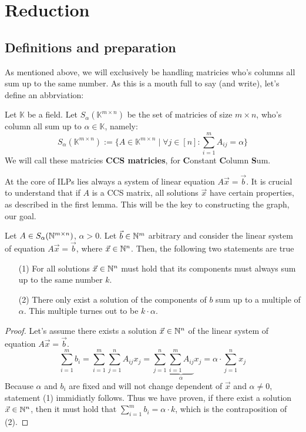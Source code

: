 \section{Reduction}
\subsection{Definitions and preparation}
As mentioned above, we will exclusively be handling matricies who's columns all sum up to the same number. As this is a mouth full to say (and write), let's define an abbrviation:

\begin{definition}
    Let $\mathbb{K}$ be a field. Let $S_{\alpha}(\mathbb{K}^{m \times n})$ be the set of matricies of size $m \times n$, who's column all sum up to $\alpha \in \mathbb{K}$, namely:
    $$S_{\alpha}(\mathbb{K}^{m \times n}) := \{A \in \mathbb{K}^{m \times n}\mid \forall j \in [n]\colon \sum_{i=1}^{m} A_{ij} = \alpha\}$$
    We will call these matricies \textbf{CCS matricies}, for \textbf{C}onstant \textbf{C}olumn \textbf{S}um.
\end{definition}

At the core of ILPs lies always a system of linear equation $A \vec x = \vec b$. It is crucial to understand that if $A$ is a CCS matrix, all solutions $\vec x$ have certain properties, as described in the first lemma. This will be the key to constructing the graph, our goal. 

\begin{lemma}
    \label{lemma:ilp_pre1}
    Let $A\in S_\alpha(\mathbb{N}^{m \times n})$, $\alpha > 0$. Let $\vec b \in \mathbb{N}^m$ arbitrary and consider the linear system of equation $A\vec x=\vec b$, where $\vec x \in \mathbb{N}^n$. Then, the following two statements are true

    \begin{enumerate}
        \item[(1)] For all solutions $\vec x \in \mathbb{N}^n$ must hold that its components must always sum up to the same number $k$.
        \item[(2)] There only exist a solution of the components of $b$ sum up to a multiple of $\alpha$. This multiple turnes out to be $k \cdot \alpha$.
    \end{enumerate}
\end{lemma}

\begin{proof}
    Let's assume there exists a solution $\vec x \in \mathbb{N}^n$ of the linear system of equation $A\vec x=\vec b$.
    $$\sum_{i=1}^m b_i = \sum_{i=1}^{m}\sum_{j=1}^{n}A_{ij} x_j = \sum_{j=1}^{n}\underbrace{\sum_{i=1}^{m}A_{ij}}_\alpha x_j = \alpha \cdot \sum_{j=1}^{n}x_j$$
    Because $\alpha$ and $b_i$ are fixed and will not change dependent of $\vec x$ and $\alpha \neq 0$, statement (1) immidiatly follows. Thus we have proven, if there exist a solution $\vec x \in \mathbb{N}^n$, then it must hold that $\sum_{i=1}^{m}b_i = \alpha \cdot k$, which is the contraposition of (2).
\end{proof}


